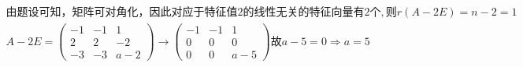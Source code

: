 
$\begin{array}{l}\mathrm{由题设可知}，\mathrm{矩阵可对角化}，\mathrm{因此对应于特征值}2\mathrm{的线性无关的特征向量有}2个,则r(A-2E)=n-2=1\\A-2E=\begin{pmatrix}-1&-1&1\\2&2&-2\\-3&-3&a-2\end{pmatrix}\rightarrow\begin{pmatrix}-1&-1&1\\0&0&0\\0&0&a-5\end{pmatrix}故a-5=0\Rightarrow a=5\end{array}$
